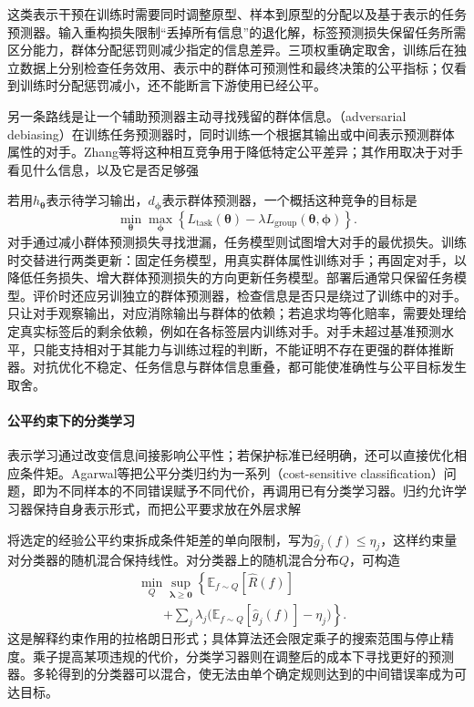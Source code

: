 这类表示干预在训练时需要同时调整原型、样本到原型的分配以及基于表示的任务预测器。输入重构损失限制“丢掉所有信息”的退化解，标签预测损失保留任务所需区分能力，群体分配惩罚则减少指定的信息差异。三项权重确定取舍，训练后在独立数据上分别检查任务效用、表示中的群体可预测性和最终决策的公平指标；仅看到训练时分配惩罚减小，还不能断言下游使用已经公平。

另一条路线是让一个辅助预测器主动寻找残留的群体信息。（adversarial debiasing）在训练任务预测器时，同时训练一个根据其输出或中间表示预测群体属性的对手。Zhang等将这种相互竞争用于降低特定公平差异；其作用取决于对手看见什么信息，以及它是否足够强

若用$h_{\bm{\theta}}$表示待学习输出，$d_{\bm{\phi}}$表示群体预测器，一个概括这种竞争的目标是
\[
 \min_{\bm{\theta}}\max_{\bm{\phi}}
 \left\{L_{\mathrm{task}}(\bm{\theta})
       -\lambda L_{\mathrm{group}}(\bm{\theta},\bm{\phi})\right\}.
\]
对手通过减小群体预测损失寻找泄漏，任务模型则试图增大对手的最优损失。训练时交替进行两类更新：固定任务模型，用真实群体属性训练对手；再固定对手，以降低任务损失、增大群体预测损失的方向更新任务模型。部署后通常只保留任务模型。评价时还应另训独立的群体预测器，检查信息是否只是绕过了训练中的对手。只让对手观察输出，对应消除输出与群体的依赖；若追求均等化赔率，需要处理给定真实标签后的剩余依赖，例如在各标签层内训练对手。对手未超过基准预测水平，只能支持相对于其能力与训练过程的判断，不能证明不存在更强的群体推断器。对抗优化不稳定、任务信息与群体信息重叠，都可能使准确性与公平目标发生取舍。

\paragraph{公平约束下的分类学习}

表示学习通过改变信息间接影响公平性；若保护标准已经明确，还可以直接优化相应条件矩。Agarwal等把公平分类归约为一系列（cost-sensitive classification）问题，即为不同样本的不同错误赋予不同代价，再调用已有分类学习器。归约允许学习器保持自身表示形式，而把公平要求放在外层求解

将选定的经验公平约束拆成条件矩差的单向限制，写为$\hat g_j(f)\leq\eta_j$，这样约束量对分类器的随机混合保持线性。对分类器上的随机混合分布$Q$，可构造
\begin{equation}
\begin{aligned}
 &\min_Q\sup_{\bm{\lambda}\geq\bm{0}}
 \left\{\mathbb E_{f\sim Q}[\hat R(f)]\right.\\
 &\qquad\left.+
 \sum_j\lambda_j
 \bigl(\mathbb E_{f\sim Q}[\hat g_j(f)]-\eta_j\bigr)
 \right\}.
\end{aligned}
 \label{eq:fairness-reduction}
\end{equation}
这是解释约束作用的拉格朗日形式；具体算法还会限定乘子的搜索范围与停止精度。乘子提高某项违规的代价，分类学习器则在调整后的成本下寻找更好的预测器。多轮得到的分类器可以混合，使无法由单个确定规则达到的中间错误率成为可达目标。

